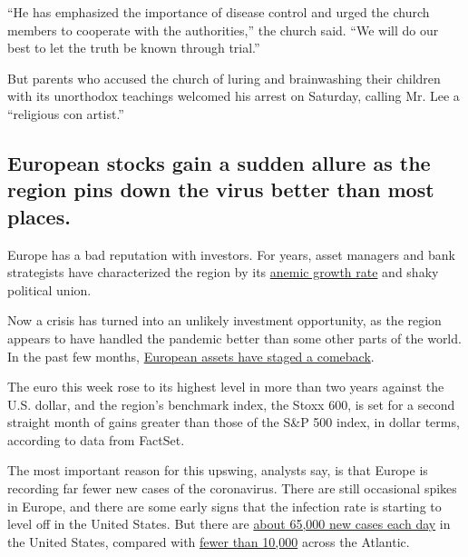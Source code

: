 ``He has emphasized the importance of disease control and urged the
church members to cooperate with the authorities,'' the church said.
``We will do our best to let the truth be known through trial.''

But parents who accused the church of luring and brainwashing their
children with its unorthodox teachings welcomed his arrest on Saturday,
calling Mr. Lee a ``religious con artist.''

\hypertarget{european-stocks-gain-a-sudden-allure-as-the-region-pins-down-the-virus-better-than-most-places}{%
\subsection{European stocks gain a sudden allure as the region pins down
the virus better than most
places.}\label{european-stocks-gain-a-sudden-allure-as-the-region-pins-down-the-virus-better-than-most-places}}

Europe has a bad reputation with investors. For years, asset managers
and bank strategists have characterized the region by its
\href{https://qz.com/1544961/the-euro-zone-economy-is-back-on-familiar-ground-slow-grinding-growth/}{anemic
growth rate} and shaky political union.

Now a crisis has turned into an unlikely investment opportunity, as the
region appears to have handled the pandemic better than some other parts
of the world. In the past few months,
\href{https://www.nytimes.com/2020/07/30/business/europes-markets-are-having-a-moment.html}{European
assets have staged a comeback}.

The euro this week rose to its highest level in more than two years
against the U.S. dollar, and the region's benchmark index, the Stoxx
600, is set for a second straight month of gains greater than those of
the S\&P 500 index, in dollar terms, according to data from FactSet.

The most important reason for this upswing, analysts say, is that Europe
is recording far fewer new cases of the coronavirus. There are still
occasional spikes in Europe, and there are some early signs that the
infection rate is starting to level off in the United States. But there
are
\href{https://www.nytimes.com/interactive/2020/us/coronavirus-us-cases.html?campaign_id=154\&emc=edit_cb_20200728\&instance_id=20725\&nl=coronavirus-briefing\&regi_id=137662381\&segment_id=34584\&te=1\&user_id=72eee90673e6857ae5a6e83e1981a59a}{about
65,000 new cases each day} in the United States, compared with
\href{https://www.ecdc.europa.eu/en/cases-2019-ncov-eueea}{fewer than
10,000} across the Atlantic.

